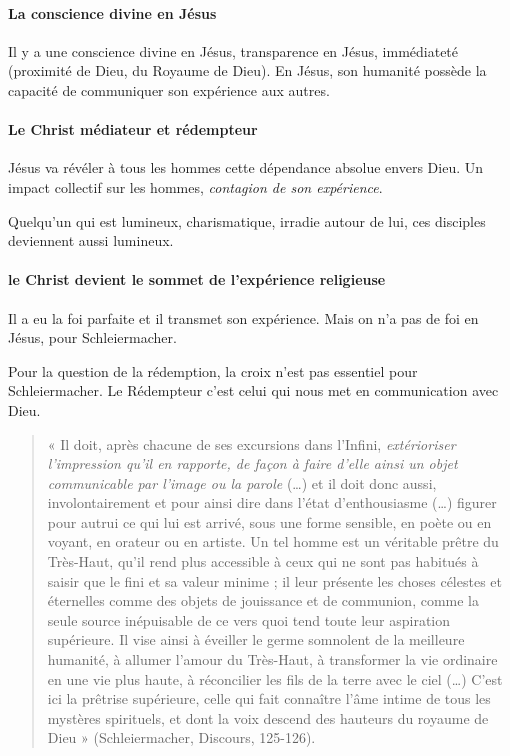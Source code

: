 \paragraph{La conscience divine en Jésus} Il y a une conscience divine en Jésus, transparence en Jésus, immédiateté (proximité de Dieu, du Royaume de Dieu).
En Jésus, son humanité possède la capacité de communiquer son expérience aux autres.



\paragraph{Le Christ médiateur et rédempteur} Jésus va révéler à tous les hommes cette dépendance absolue envers Dieu. Un impact collectif sur les hommes, \textit{contagion de son expérience}. 
\begin{Ex}
Quelqu'un qui est lumineux, charismatique, irradie autour de lui, ces disciples deviennent aussi lumineux.
\end{Ex}

\paragraph{le Christ devient le sommet de l'expérience religieuse} Il a eu la foi parfaite et il transmet son expérience. Mais on n'a pas de foi en Jésus, pour Schleiermacher.

Pour la question de la rédemption, la croix n'est pas essentiel pour Schleiermacher. Le Rédempteur c'est celui qui nous met en communication avec Dieu. 





\begin{quote}
    « Il doit, après chacune de ses excursions dans l’Infini, \textit{extérioriser l’impression qu’il en rapporte, de façon à faire d’elle ainsi un objet communicable par l’image ou la parole} (…) et il doit donc aussi, involontairement et pour ainsi dire dans l’état d’enthousiasme (…) figurer pour autrui ce qui lui est arrivé, sous une forme sensible, en poète ou en voyant, en orateur ou en artiste. Un tel homme est un véritable prêtre du Très-Haut, qu’il rend plus accessible à ceux qui ne sont pas habitués à saisir que le fini et sa valeur minime ; il leur présente les choses célestes et éternelles comme des objets de jouissance et de communion, comme la seule source inépuisable de ce vers quoi tend toute leur aspiration supérieure. Il vise ainsi à éveiller le germe somnolent de la meilleure humanité, à allumer l’amour du Très-Haut, à transformer la vie ordinaire en une vie plus haute, à réconcilier les fils de la terre avec le ciel (…) C’est ici la prêtrise supérieure, celle qui fait connaître l’âme intime de tous les mystères spirituels, et dont la voix descend des hauteurs du royaume de Dieu » (Schleiermacher, Discours, 125-126).
\end{quote}





